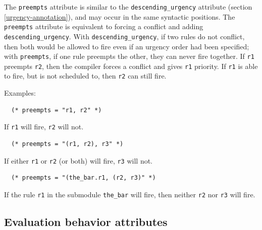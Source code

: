 \documentclass[twoside,letterpaper]{article}
\newcommand{\te}[1]{\texttt{#1}}
\begin{document}
The \te{preempts} attribute is similar to the \te{descending\_urgency}
attribute (section \ref{urgency-annotation}),  and may occur in the
same syntactic positions.   The \te{preempts}
attribute is equivalent to forcing a conflict and adding
\te{descending\_urgency}.
With  \te{descending\_urgency},  if two rules do not conflict, then
both would  be allowed to fire  even if an urgency order had been
specified;  with \te{preempts}, if one rule
preempts  the other, they can never fire together.   If \te{r1} preempts
\te{r2},  then the compiler
forces a conflict and gives \te{r1} priority.   If \te{r1} is able to
fire, but is not scheduled to, then \te{r2} can still fire. 



Examples:
\begin{verbatim}
  (* preempts = "r1, r2" *)
\end{verbatim}
If \te{r1} will fire, \te{r2} will not.
\begin{verbatim}
  (* preempts = "(r1, r2), r3" *)
\end{verbatim}
If either \te{r1} or \te{r2} (or both) will fire, \te{r3} will not.
\begin{verbatim}
  (* preempts = "(the_bar.r1, (r2, r3)" *)
\end{verbatim}
If the rule \te{r1} in the submodule \te{the\_bar} will fire, then
neither \te{r2} nor \te{r3} will fire. 


\subsection{Evaluation behavior attributes}
\end{document}
